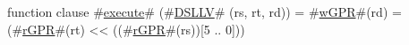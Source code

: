 function clause #\hyperref[zexecute]{execute}# (#\hyperref[zDSLLV]{DSLLV}# (rs, rt, rd)) =
  {
    #\hyperref[zwGPR]{wGPR}#(rd) = (#\hyperref[zrGPR]{rGPR}#(rt) << ((#\hyperref[zrGPR]{rGPR}#(rs))[5 .. 0]))
  }
